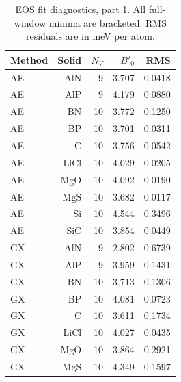 \begin{table}[t]
\centering
\small
\caption{EOS fit diagnostics, part 1. All full-window minima are bracketed. RMS residuals are in meV per atom.}
\label{tab:eos-fit-1}
\begin{tabular}{lrrrr}
\toprule
Method & Solid & $N_V$ & $B'_0$ & RMS \\
\midrule
AE & AlN & 9 & 3.707 & 0.0418 \\
AE & AlP & 9 & 4.179 & 0.0880 \\
AE & BN & 10 & 3.772 & 0.1250 \\
AE & BP & 10 & 3.701 & 0.0311 \\
AE & C & 10 & 3.756 & 0.0542 \\
AE & LiCl & 10 & 4.029 & 0.0205 \\
AE & MgO & 10 & 4.092 & 0.0190 \\
AE & MgS & 10 & 3.682 & 0.0117 \\
AE & Si & 10 & 4.544 & 0.3496 \\
AE & SiC & 10 & 3.854 & 0.0449 \\
GX & AlN & 9 & 2.802 & 0.6739 \\
GX & AlP & 9 & 3.959 & 0.1431 \\
GX & BN & 10 & 3.713 & 0.1306 \\
GX & BP & 10 & 4.081 & 0.0723 \\
GX & C & 10 & 3.611 & 0.1734 \\
GX & LiCl & 10 & 4.027 & 0.0435 \\
GX & MgO & 10 & 3.864 & 0.2921 \\
GX & MgS & 10 & 4.349 & 0.1597 \\
\bottomrule
\end{tabular}
\end{table}

